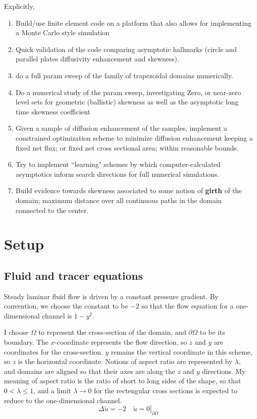 \documentclass{amsart}
\begin{document}
Explicitly,
\begin{enumerate}
\item Build/use finite element code on a platform that also allows for 
implementing a Monte Carlo style simulation
\item Quick validation of the code comparing asymptotic hallmarks 
(circle and parallel plates diffusivity enhancement and skewness).
\item do a full param sweep of the family of trapezoidal domains numerically. 
\item Do a numerical study of the param sweep, investigating
Zero, or near-zero level sets for geometric (ballistic) skewness 
as well as the asymptotic long time skewness coefficient
\item Given a sample of diffusion enhancement of the samples, 
implement a constrained optimization scheme to minimize 
diffusion enhancement keeping a fixed net flux; or fixed net 
cross sectional area; within reasonable bounds.
\item Try to implement ``learning" schemes by which computer-calculated 
asymptotics inform search directions for full numerical simulations.
\item Build evidence towards skewness associated to some notion of 
\textbf{girth} of the domain; maximum distance over all continuous 
paths in the domain connected to the center. 
\end{enumerate}

\section{Setup}
\subsection{Fluid and tracer equations}
Steady laminar fluid flow is driven by a constant pressure gradient. 
By convention, we choose the constant to be $-2$ so that the flow 
equation for a one-dimensional channel is $1-y^2$.

I choose $\Omega$ to represent the cross-section of the domain, and 
$\partial \Omega$ to be its boundary. The $x$-coordinate represents the 
flow direction, so $z$ and $y$ are coordinates for the cross-section. 
$y$ remains the vertical coordinate in this scheme, so $z$ is the horizontal coordinate. 
Notions of aspect ratio are represented by $\lambda$, and domains are 
aligned so that their axes are along the $z$ and $y$ directions. 
My meaning of aspect ratio is the ratio of short to long sides of the 
shape, so that $0 < \lambda \leq 1$, and a limit $\lambda \to 0$ for 
the rectengular cross sections is expected to reduce to the one-dimensional 
channel.
%
\begin{equation}
\label{flow_equation}
\Delta \tilde{u} = -2 \quad \left. \tilde{u} = 0 \right|_{\partial \Omega}
\end{equation}
\end{document}
